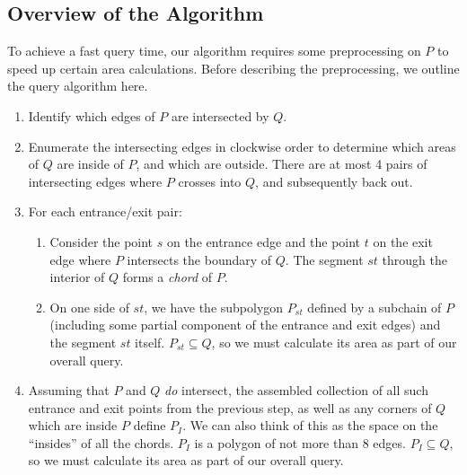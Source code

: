 \subsection{Overview of the Algorithm}
\label{:convexp:approach}

To achieve a fast query time, our algorithm requires some preprocessing on $P$ to speed up certain area calculations. Before describing the preprocessing, we outline the query algorithm here.

\begin{enumerate}
 \item Identify which edges of $P$ are intersected by $Q$.
 
 \item Enumerate the intersecting edges in clockwise order to determine which areas of $Q$ are inside of $P$, and which are outside. There are at most 4 pairs of intersecting edges where $P$ crosses into $Q$, and subsequently back out.
 
 \item For each entrance/exit pair:
 \begin{enumerate}
  \item Consider the point $s$ on the entrance edge and the point $t$ on the exit edge where $P$ intersects the boundary of $Q$.
  The segment $st$ through the interior of $Q$ forms a \emph{chord} of $P$.
  
  \item On one side of $st$, we have the subpolygon $P_{st}$ defined by a subchain of $P$ (including some partial component of the entrance and exit edges) and the segment $st$ itself. 
  $P_{st} \subseteq Q$, so we must calculate its area as part of our overall query.
  
 \end{enumerate}

 \item Assuming that $P$ and $Q$ \emph{do} intersect, the assembled collection of all such entrance and exit points from the previous step, as well as any corners of $Q$ which are inside $P$ define $P_I$.
We can also think of this as the space on the ``insides'' of all the chords. 
$P_I$ is a polygon of not more than 8 edges. 
$P_I \subseteq Q$, so we must calculate its area as part of our overall query.
 
\end{enumerate}


